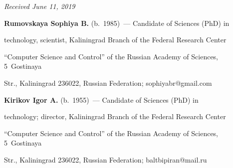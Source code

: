 


\hfill{\small\textit{Received June 11, 2019}}







 

   

   

   

   \Contr

   

\noindent

\textbf{Rumovskaya Sophiya B.} (b.\ 1985)~--- Candidate of Sciences (PhD) in 

technology, scientist, Kaliningrad Branch of the Federal Research Center 

``Computer Science and Control'' of the Russian Academy of Sciences, 5~Gostinaya 

Str., Kaliningrad 236022, Russian Federation; \mbox{sophiyabr@gmail.com}



\vspace*{3pt}



\noindent

\textbf{Kirikov Igor A.} (b.\ 1955)~--- Candidate of Sciences (PhD) in 

technology; director, Kaliningrad Branch of the Federal Research Center 

``Computer Science and Control'' of the Russian Academy of Sciences, 5~Gostinaya 

Str., Kaliningrad 236022, Russian Federation; \mbox{baltbipiran@mail.ru} 

\label{end\stat}



\renewcommand{\bibname}{\protect\rm Литература}

    

